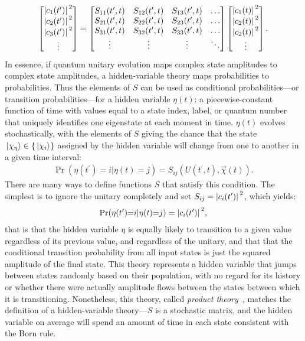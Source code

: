 \begin{align}
\left[\begin{matrix}
\abs{c_1(t^\prime)}^2\\\abs{c_2(t^\prime)}^2\\\abs{c_3(t^\prime)}^2\\\vdots
\end{matrix}\right]
= \left[\begin{matrix}
S_{11}(t^\prime, t) & S_{12}(t^\prime, t) & S_{13}(t^\prime, t)&\hdots\\
S_{21}(t^\prime, t) & S_{22}(t^\prime, t) & S_{23}(t^\prime, t)&\hdots\\
S_{31}(t^\prime, t) & S_{32}(t^\prime, t) & S_{33}(t^\prime, t)&\hdots\\
\vdots & \vdots & \vdots & \ddots
\end{matrix}\right]
\left[\begin{matrix}
\abs{c_1(t)}^2\\\abs{c_2(t)}^2\\\abs{c_2(t)}^2\\\vdots
\end{matrix}\right].
\end{align}
In essence, if quantum unitary evolution maps complex state amplitudes to complex state amplitudes, a hidden-variable theory maps probabilities to probabilities. Thus the elements of $S$ can be used as conditional probabilities---or transition probabilities---for a hidden variable $\eta(t)$: a piecewise-constant function of time with values equal to a state index, label, or quantum number that uniquely identifies one eigenstate at each moment in time. $\eta(t)$ evolves stochastically, with the elements of $S$ giving the chance that the state $\ket{\chi_\eta} \in \{\ket{\chi_i}\}$ assigned by the hidden variable will change from one to another in a given time interval:
\begin{align}\label{eq:conditional_probability}
\Pr(\eta(t^\prime){=}i|\eta(t){=}j) = S_{ij}(U(t^\prime, t), \vec\chi(t)).
\end{align}
There are many ways to define functions $S$ that satisfy this condition. The simplest is to ignore the unitary completely and set $S_{ij} = \abs{c_i(t^\prime)}^2$, which yields:
\begin{align}
\Pr(\eta(t^\prime){=}i|\eta(t){=}j) = \abs{c_{i}(t^\prime)}^2,
\end{align}
that is that the hidden variable $\eta$ is equally likely to transition to a given value regardless of its previous value, and regardless of the unitary, and that that the conditional transition probability from all input states is just the squared amplitude of the final state. This theory represents a hidden variable that jumps between states randomly based on their population, with no regard for its history or whether there were actually amplitude flows between the states between which it is transitioning. Nonetheless, this theory, called \emph{product theory}~\cite{PhysRevA.71.032325}, matches the definition of a hidden-variable theory---$S$ is a stochastic matrix, and the hidden variable on average will spend an amount of time in each state consistent with the Born rule.

